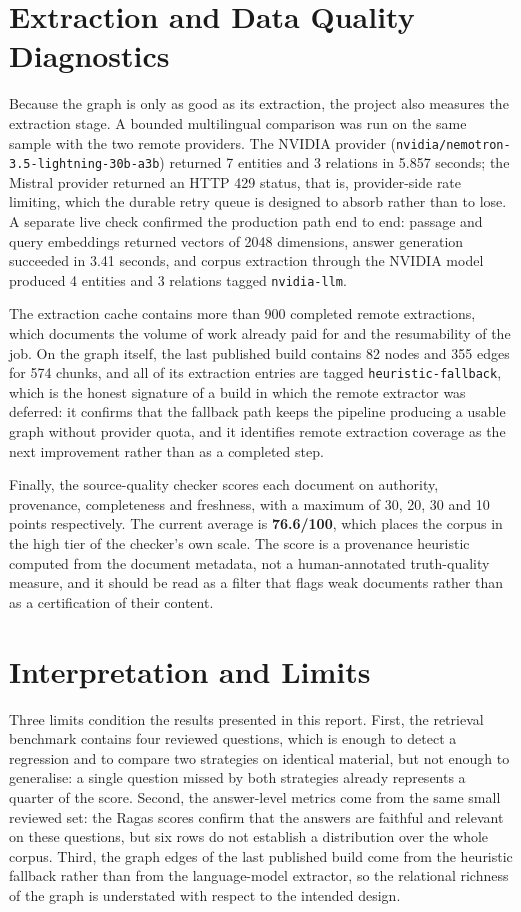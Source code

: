 \section{Extraction and Data Quality Diagnostics}
\label{sec:diagnostics}
Because the graph is only as good as its extraction, the project also measures the extraction stage. A bounded multilingual comparison was run on the same sample with the two remote providers. The NVIDIA provider (\texttt{nvidia/nemotron-3.5-lightning-30b-a3b}) returned 7 entities and 3 relations in 5.857 seconds; the Mistral provider returned an HTTP 429 status, that is, provider-side rate limiting, which the durable retry queue is designed to absorb rather than to lose. A separate live check confirmed the production path end to end: passage and query embeddings returned vectors of 2048 dimensions, answer generation succeeded in 3.41 seconds, and corpus extraction through the NVIDIA model produced 4 entities and 3 relations tagged \texttt{nvidia-llm}.

The extraction cache contains more than 900 completed remote extractions, which documents the volume of work already paid for and the resumability of the job. On the graph itself, the last published build contains 82 nodes and 355 edges for 574 chunks, and all of its extraction entries are tagged \texttt{heuristic-fallback}, which is the honest signature of a build in which the remote extractor was deferred: it confirms that the fallback path keeps the pipeline producing a usable graph without provider quota, and it identifies remote extraction coverage as the next improvement rather than as a completed step.

Finally, the source-quality checker scores each document on authority, provenance, completeness and freshness, with a maximum of 30, 20, 30 and 10 points respectively. The current average is \textbf{76.6/100}, which places the corpus in the high tier of the checker's own scale. The score is a provenance heuristic computed from the document metadata, not a human-annotated truth-quality measure, and it should be read as a filter that flags weak documents rather than as a certification of their content.

\section{Interpretation and Limits}
\label{sec:limits}
Three limits condition the results presented in this report. First, the retrieval benchmark contains four reviewed questions, which is enough to detect a regression and to compare two strategies on identical material, but not enough to generalise: a single question missed by both strategies already represents a quarter of the score. Second, the answer-level metrics come from the same small reviewed set: the Ragas scores confirm that the answers are faithful and relevant on these questions, but six rows do not establish a distribution over the whole corpus. Third, the graph edges of the last published build come from the heuristic fallback rather than from the language-model extractor, so the relational richness of the graph is understated with respect to the intended design.


